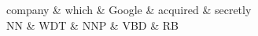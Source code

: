 \documentclass{article}
\begin{document}
\thispagestyle{empty}
\begin{center}
 \begin{dependency}[theme = default]
   \begin{deptext}[column sep=1em]
   company \& which \& Google \& acquired \& secretly \\
   NN \& WDT \& NNP \& VBD \& RB \\
   \end{deptext}
\end{dependency} \\
\end{center}
\end{document}
